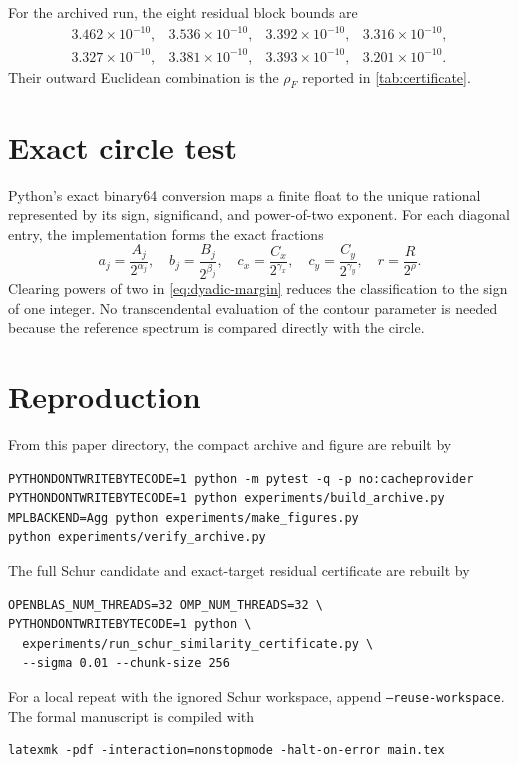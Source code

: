 \documentclass[11pt]{article}
\theoremstyle{definition}
\theoremstyle{remark}
\begin{document}
For the archived run, the eight residual block bounds are
\[
\begin{array}{cccc}
3.462{\times}10^{-10},&
3.536{\times}10^{-10},&
3.392{\times}10^{-10},&
3.316{\times}10^{-10},\\
3.327{\times}10^{-10},&
3.381{\times}10^{-10},&
3.393{\times}10^{-10},&
3.201{\times}10^{-10}.
\end{array}
\]
Their outward Euclidean combination is the \(\rho_F\) reported in
\cref{tab:certificate}.

\section{Exact circle test}
\label{app:circle-test}

Python's exact binary64 conversion maps a finite float to the unique
rational represented by its sign, significand, and power-of-two exponent.
For each diagonal entry, the implementation forms the exact fractions
\[
 a_j=\frac{A_j}{2^{\alpha_j}},\quad
 b_j=\frac{B_j}{2^{\beta_j}},\quad
 c_x=\frac{C_x}{2^{\gamma_x}},\quad
 c_y=\frac{C_y}{2^{\gamma_y}},\quad
 r=\frac{R}{2^\rho}.
\]
Clearing powers of two in \cref{eq:dyadic-margin} reduces the classification
to the sign of one integer.  No transcendental evaluation of the contour
parameter is needed because the reference spectrum is compared directly
with the circle.

\section{Reproduction}
\label{app:reproduction}

From this paper directory, the compact archive and figure are rebuilt by
\begin{verbatim}
PYTHONDONTWRITEBYTECODE=1 python -m pytest -q -p no:cacheprovider
PYTHONDONTWRITEBYTECODE=1 python experiments/build_archive.py
MPLBACKEND=Agg python experiments/make_figures.py
python experiments/verify_archive.py
\end{verbatim}
The full Schur candidate and exact-target residual certificate are rebuilt
by
\begin{verbatim}
OPENBLAS_NUM_THREADS=32 OMP_NUM_THREADS=32 \
PYTHONDONTWRITEBYTECODE=1 python \
  experiments/run_schur_similarity_certificate.py \
  --sigma 0.01 --chunk-size 256
\end{verbatim}
For a local repeat with the ignored Schur workspace, append
\texttt{--reuse-workspace}.  The formal manuscript is compiled with
\begin{verbatim}
latexmk -pdf -interaction=nonstopmode -halt-on-error main.tex
\end{verbatim}



\end{document}
